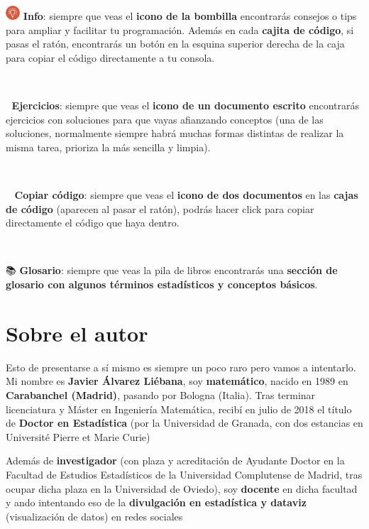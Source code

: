 \documentclass[11pt,]{book}
\begin{document}
\includegraphics[width=0.04\textwidth,height=\textheight]{img/logo_info.png} \textbf{Info}: siempre que veas el \textbf{icono de la bombilla} encontrarás consejos o tips para ampliar y facilitar tu programación. Además en cada \textbf{cajita de código}, si pasas el ratón, encontrarás un botón en la esquina superior derecha de la caja para copiar el código directamente a tu consola.

~

📝 \textbf{Ejercicios}: siempre que veas el \textbf{icono de un documento escrito} encontrarás ejercicios con soluciones para que vayas afianzando conceptos (una de las soluciones, normalmente siempre habrá muchas formas distintas de realizar la misma tarea, prioriza la más sencilla y limpia).

~

📄📄 \textbf{Copiar código}: siempre que veas el \textbf{icono de dos documentos} en las \textbf{cajas de código} (aparecen al pasar el ratón), podrás hacer click para copiar directamente el código que haya dentro.

~

📚 \textbf{Glosario}: siempre que veas la pila de libros encontrarás una \textbf{sección de glosario con algunos términos estadísticos y conceptos básicos}.

\hypertarget{sobre-el-autor}{%
\section*{Sobre el autor}\label{sobre-el-autor}}


Esto de presentarse a sí mismo es siempre un poco raro pero vamos a intentarlo. Mi nombre es \textbf{Javier Álvarez Liébana}, soy \textbf{matemático}, nacido en 1989 en \textbf{Carabanchel (Madrid)}, pasando por Bologna (Italia). Tras terminar licenciatura y Máster en Ingeniería Matemática, recibí en julio de 2018 el título de \textbf{Doctor en Estadística} (por la Universidad de Granada, con dos estancias en Université Pierre et Marie Curie)

Además de \textbf{investigador} (con plaza y acreditación de Ayudante Doctor en la Facultad de Estudios Estadísticos de la Universidad Complutense de Madrid, tras ocupar dicha plaza en la Universidad de Oviedo), soy \textbf{docente} en dicha facultad y ando intentando eso de la \textbf{divulgación en estadística y dataviz} (visualización de datos) en redes sociales
\end{document}
